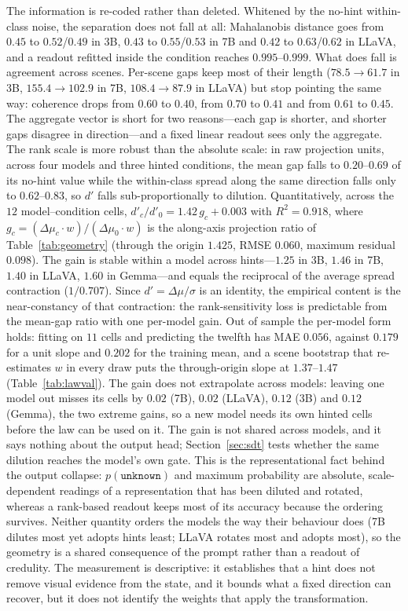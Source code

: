 \documentclass[10pt]{article}
\newcommand{\unknown}{\texttt{unknown}}
\newcommand{\punk}{p(\unknown)}
\newcommand{\wdir}{w}
\begin{document}
The information is re-coded rather than deleted. Whitened by the no-hint within-class noise, the separation does not fall at all: Mahalanobis distance goes from $0.45$ to $0.52$/$0.49$ in 3B, $0.43$ to $0.55$/$0.53$ in 7B and $0.42$ to $0.63$/$0.62$ in LLaVA, and a readout refitted inside the condition reaches $0.995$--$0.999$. What does fall is agreement across scenes. Per-scene gaps keep most of their length ($78.5\to61.7$ in 3B, $155.4\to102.9$ in 7B, $108.4\to87.9$ in LLaVA) but stop pointing the same way: coherence drops from $0.60$ to $0.40$, from $0.70$ to $0.41$ and from $0.61$ to $0.45$. The aggregate vector is short for two reasons---each gap is shorter, and shorter gaps disagree in direction---and a fixed linear readout sees only the aggregate. The rank scale is more robust than the absolute scale: in raw projection units, across four models and three hinted conditions, the mean gap falls to $0.20$--$0.69$ of its no-hint value while the within-class spread along the same direction falls only to $0.62$--$0.83$, so $d'$ falls sub-proportionally to dilution. Quantitatively, across the $12$ model--condition cells, $d'_c/d'_0=1.42\,g_c+0.003$ with $R^2=0.918$, where $g_c=(\Delta\mu_c\cdot\wdir)/(\Delta\mu_0\cdot\wdir)$ is the along-axis projection ratio of Table~\ref{tab:geometry} (through the origin $1.425$, RMSE $0.060$, maximum residual $0.098$). The gain is stable within a model across hints---$1.25$ in 3B, $1.46$ in 7B, $1.40$ in LLaVA, $1.60$ in Gemma---and equals the reciprocal of the average spread contraction ($1/0.707$). Since $d'=\Delta\mu/\sigma$ is an identity, the empirical content is the near-constancy of that contraction: the rank-sensitivity loss is predictable from the mean-gap ratio with one per-model gain. Out of sample the per-model form holds: fitting on $11$ cells and predicting the twelfth has MAE $0.056$, against $0.179$ for a unit slope and $0.202$ for the training mean, and a scene bootstrap that re-estimates $\wdir$ in every draw puts the through-origin slope at $1.37$--$1.47$ (Table~\ref{tab:lawval}). The gain does not extrapolate across models: leaving one model out misses its cells by $0.02$ (7B), $0.02$ (LLaVA), $0.12$ (3B) and $0.12$ (Gemma), the two extreme gains, so a new model needs its own hinted cells before the law can be used on it. The gain is not shared across models, and it says nothing about the output head; Section~\ref{sec:sdt} tests whether the same dilution reaches the model's own gate. This is the representational fact behind the output collapse: $\punk$ and maximum probability are absolute, scale-dependent readings of a representation that has been diluted and rotated, whereas a rank-based readout keeps most of its accuracy because the ordering survives. Neither quantity orders the models the way their behaviour does (7B dilutes most yet adopts hints least; LLaVA rotates most and adopts most), so the geometry is a shared consequence of the prompt rather than a readout of credulity. The measurement is descriptive: it establishes that a hint does not remove visual evidence from the state, and it bounds what a fixed direction can recover, but it does not identify the weights that apply the transformation.
\end{document}
